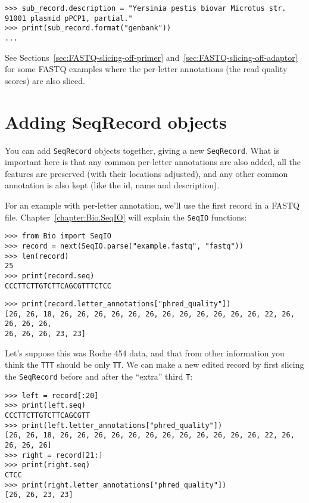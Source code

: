 \documentclass{report}
\begin{document}
\begin{verbatim}
>>> sub_record.description = "Yersinia pestis biovar Microtus str. 91001 plasmid pPCP1, partial."
>>> print(sub_record.format("genbank"))
...
\end{verbatim}

See Sections~\ref{sec:FASTQ-slicing-off-primer}
and~\ref{sec:FASTQ-slicing-off-adaptor} for some FASTQ examples where the
per-letter annotations (the read quality scores) are also sliced.

\section{Adding SeqRecord objects}
\label{sec:SeqRecord-addition}

You can add \verb|SeqRecord| objects together, giving a new \verb|SeqRecord|.
What is important here is that any common
per-letter annotations are also added, all the features are preserved (with their
locations adjusted), and any other common annotation is also kept (like the id, name
and description).

For an example with per-letter annotation, we'll use the first record in a
FASTQ file. Chapter~\ref{chapter:Bio.SeqIO} will explain the \verb|SeqIO| functions:

\begin{verbatim}
>>> from Bio import SeqIO
>>> record = next(SeqIO.parse("example.fastq", "fastq"))
>>> len(record)
25
>>> print(record.seq)
CCCTTCTTGTCTTCAGCGTTTCTCC
\end{verbatim}
\begin{verbatim}
>>> print(record.letter_annotations["phred_quality"])
[26, 26, 18, 26, 26, 26, 26, 26, 26, 26, 26, 26, 26, 26, 26, 22, 26, 26, 26, 26,
26, 26, 26, 23, 23]
\end{verbatim}

\noindent Let's suppose this was Roche 454 data, and that from other information
you think the \texttt{TTT} should be only \texttt{TT}. We can make a new edited
record by first slicing the \verb|SeqRecord| before and after the ``extra''
third \texttt{T}:

\begin{verbatim}
>>> left = record[:20]
>>> print(left.seq)
CCCTTCTTGTCTTCAGCGTT
>>> print(left.letter_annotations["phred_quality"])
[26, 26, 18, 26, 26, 26, 26, 26, 26, 26, 26, 26, 26, 26, 26, 22, 26, 26, 26, 26]
>>> right = record[21:]
>>> print(right.seq)
CTCC
>>> print(right.letter_annotations["phred_quality"])
[26, 26, 23, 23]
\end{verbatim}
\end{document}
